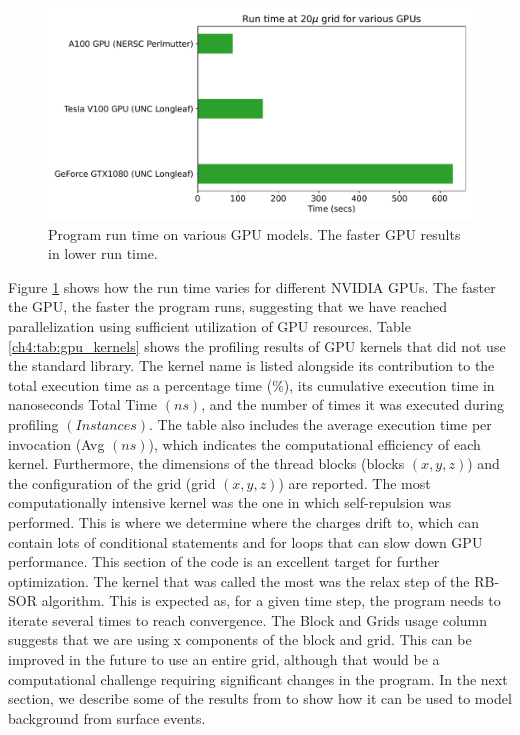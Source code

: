 \begin{figure}[!htb]
    \centering
    \includegraphics[width=0.99\linewidth]{ch4/figs/gpu_comp.pdf}
\caption{\label{ch4:fig:GPU_comp} Program run time on various GPU models. The faster GPU results in lower run time.}
\end{figure}

Figure \ref{ch4:fig:GPU_comp} shows how the run time varies for different NVIDIA GPUs. The faster the GPU, the faster the program runs, suggesting that we have reached parallelization using sufficient utilization of GPU resources. Table \ref{ch4:tab:gpu_kernels} shows the profiling results of GPU kernels that did not use the standard library. The kernel name is listed alongside its contribution to the total execution time as a percentage time ($\%$), its cumulative execution time in nanoseconds Total Time $(ns)$, and the number of times it was executed during profiling $(Instances)$. The table also includes the average execution time per invocation (Avg $(ns)$), which indicates the computational efficiency of each kernel. Furthermore, the dimensions of the thread blocks (blocks $(x, y, z)$) and the configuration of the grid (grid $(x, y, z)$) are reported. The most computationally intensive kernel was the one in which self-repulsion was performed. This is where we determine where the charges drift to, which can contain lots of conditional statements and for loops that can slow down GPU performance. This section of the code is an excellent target for further optimization. The kernel that was called the most was the relax step of the RB-SOR algorithm. This is expected as, for a given time step, the program needs to iterate several times to reach convergence. The Block and Grids usage column suggests that we are using x components of the block and grid. This can be improved in the future to use an entire grid, although that would be a computational challenge requiring significant changes in the program. In the next section, we describe some of the results from {\ehd} to show how it can be used to model background from surface events.



